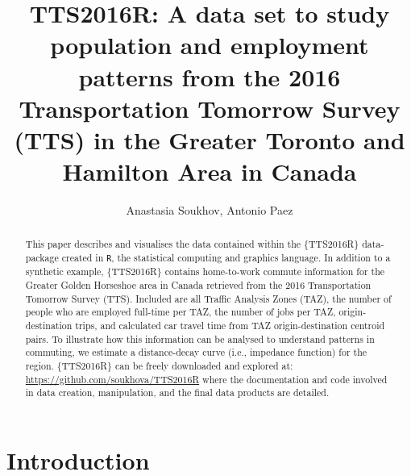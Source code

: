 \documentclass[Royal,times,sageh]{sagej}
\begin{document}

\title{TTS2016R: A data set to study population and employment patterns
from the 2016 Transportation Tomorrow Survey (TTS) in the Greater
Toronto and Hamilton Area in Canada}

\runninghead{}

\author{Anastasia Soukhov\affilnum{}, Antonio Paez\affilnum{}}

\affiliation{\affilnum{}{}}



\begin{abstract}
This paper describes and visualises the data contained within the
\{TTS2016R\} data-package created in \texttt{R}, the statistical
computing and graphics language. In addition to a synthetic example,
\{TTS2016R\} contains home-to-work commute information for the Greater
Golden Horseshoe area in Canada retrieved from the 2016 Transportation
Tomorrow Survey (TTS). Included are all Traffic Analysis Zones (TAZ),
the number of people who are employed full-time per TAZ, the number of
jobs per TAZ, origin-destination trips, and calculated car travel time
from TAZ origin-destination centroid pairs. To illustrate how this
information can be analysed to understand patterns in commuting, we
estimate a distance-decay curve (i.e., impedance function) for the
region. \{TTS2016R\} can be freely downloaded and explored at:
\url{https://github.com/soukhova/TTS2016R} where the documentation and
code involved in data creation, manipulation, and the final data
products are detailed.
\end{abstract}


\maketitle

\hypertarget{introduction}{%
\section{Introduction}\label{introduction}}
\end{document}
